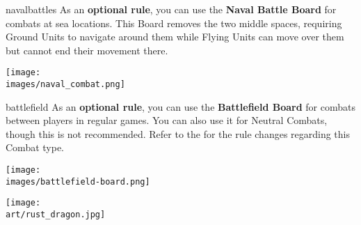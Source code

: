\begin{multicols*}{2}

\begin{expansion}{navalbattles}
  As an \textbf{optional rule}, you can use the \textbf{Naval Battle Board} for combats at sea locations.
  This Board removes the two middle spaces, requiring Ground  Units to navigate around them while Flying  Units can move over them but cannot end their movement there.

  \begin{center}
    \texttt{[image: \\images/naval\_combat.png]}
  \end{center}
\end{expansion}

\vspace{2em}
\begin{expansion}{battlefield}
  As an \textbf{optional rule}, you can use the \textbf{Battlefield Board} for combats between players in regular games.
  You can also use it for Neutral Combats, though this is not recommended.
  Refer to the  for the rule changes regarding this Combat type.

  \begin{center}
    \texttt{[image: \\images/battlefield-board.png]}
  \end{center}
\end{expansion}
\vfill

\begin{center}
  \texttt{[image: \\art/rust\_dragon.jpg]}
\end{center}

\end{multicols*}
